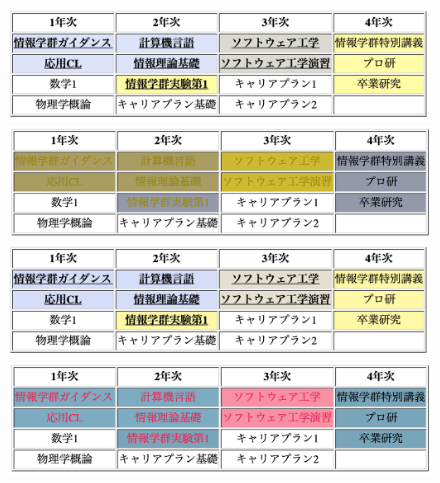 \begin{figure}[H]
\begin{minipage}[b]{.49\columnwidth}
    \end{minipage}
    \begin{minipage}[b]{.49\columnwidth}
        \centering
        \includegraphics[keepaspectratio,width=\textwidth]{../../10_UniversalDesign/no1_table_RC_P.png}
    \end{minipage}
    \begin{minipage}[b]{.49\columnwidth}
        \centering
        \includegraphics[keepaspectratio,width=\textwidth]{../../10_UniversalDesign/no1_table_OC_D.png}
    \end{minipage}
    \begin{minipage}[b]{.49\columnwidth}
        \centering
        \includegraphics[keepaspectratio,width=\textwidth]{../../10_UniversalDesign/no1_table_RC_D.png}
    \end{minipage}
    \begin{minipage}[b]{.49\columnwidth}
        \centering
        \includegraphics[keepaspectratio,width=\textwidth]{../../10_UniversalDesign/no1_table_OC_T.png}

\end{minipage}
\end{figure}

